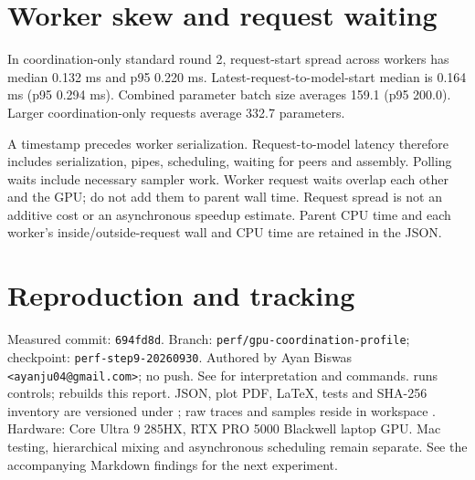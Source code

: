 \documentclass[11pt]{article}
\begin{document}
\section*{Worker skew and request waiting}
In coordination-only standard round 2, request-start spread across workers has
median 0.132 ms and p95 0.220 ms. Latest-request-to-model-start median is
0.164 ms (p95 0.294 ms). Combined parameter batch size averages 159.1
(p95 200.0). Larger coordination-only requests average 332.7 parameters.

A timestamp precedes worker serialization. Request-to-model latency therefore
includes serialization, pipes, scheduling, waiting for peers and assembly.
Polling waits include necessary sampler work. Worker request waits overlap each
other and the GPU; do not add them to parent wall time. Request spread is not
an additive cost or an asynchronous speedup estimate. Parent CPU time and each
worker's inside/outside-request wall and CPU time are retained in the JSON.
\section*{Reproduction and tracking}
\begingroup\small\raggedright
Measured commit: \texttt{694fd8d}. Branch: \texttt{perf/gpu-coordination-profile};
checkpoint: \texttt{perf-step9-20260930}. Authored by Ayan Biswas
\texttt{<ayanju04@gmail.com>}; no push. See  for
interpretation and commands.  runs
controls;  rebuilds this report.
JSON, plot PDF, LaTeX, tests and SHA-256 inventory are versioned under
; raw traces and samples reside in workspace
. Hardware: Core Ultra 9 285HX, RTX PRO 5000
Blackwell laptop GPU. Mac testing, hierarchical mixing and asynchronous scheduling
remain separate. See the accompanying Markdown findings for the next experiment.
\par\endgroup
\end{document}
